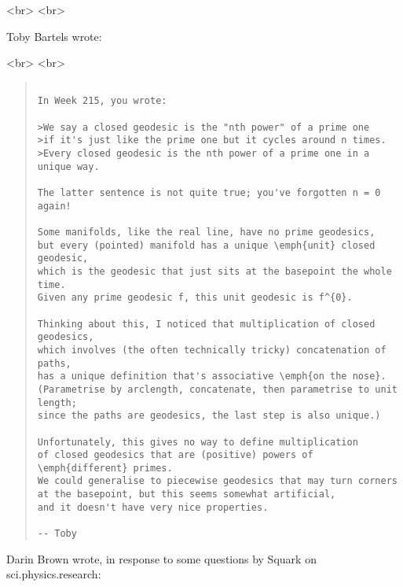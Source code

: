 <br>
<br>

Toby Bartels wrote:

<br>
<br>
\begin{quote}

\begin{verbatim}

In Week 215, you wrote:

>We say a closed geodesic is the "nth power" of a prime one
>if it's just like the prime one but it cycles around n times.
>Every closed geodesic is the nth power of a prime one in a unique way.

The latter sentence is not quite true; you've forgotten n = 0 again!

Some manifolds, like the real line, have no prime geodesics,
but every (pointed) manifold has a unique \emph{unit} closed geodesic,
which is the geodesic that just sits at the basepoint the whole time.
Given any prime geodesic f, this unit geodesic is f^{0}.

Thinking about this, I noticed that multiplication of closed geodesics,
which involves (the often technically tricky) concatenation of paths,
has a unique definition that's associative \emph{on the nose}.
(Parametrise by arclength, concatenate, then parametrise to unit length;
since the paths are geodesics, the last step is also unique.)

Unfortunately, this gives no way to define multiplication
of closed geodesics that are (positive) powers of \emph{different} primes.
We could generalise to piecewise geodesics that may turn corners
at the basepoint, but this seems somewhat artificial,
and it doesn't have very nice properties.

-- Toby

\end{verbatim}
    
\end{quote}

Darin Brown wrote, in response to some questions by Squark
on sci.physics.research:

